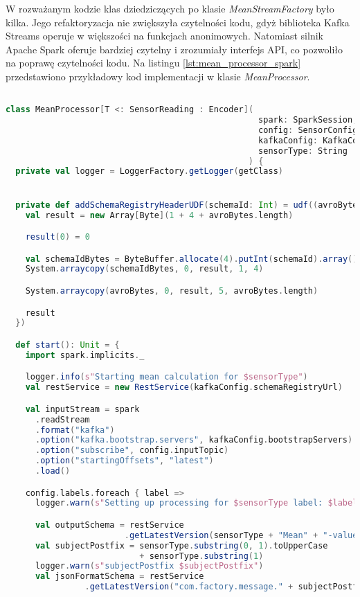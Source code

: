 \newpage

W rozważanym kodzie klas dziedziczących po klasie \textit{MeanStreamFactory} było kilka. Jego refaktoryzacja nie zwiększyła czytelności kodu, gdyż biblioteka Kafka Streams \cite{kafka_streams} operuje w większości na funkcjach anonimowych. Natomiast silnik Apache Spark oferuje bardziej czytelny i zrozumiały interfejs API, co pozwoliło na poprawę czytelności kodu. Na listingu \ref{lst:mean_processor_spark} przedstawiono przykładowy kod implementacji w klasie \textit{\mbox{MeanProcessor}}.

\begin{lstlisting}[caption=Nowa implementacja przetwarzająca strumienie danych, label={lst:mean_processor_spark},language=Scala]

class MeanProcessor[T <: SensorReading : Encoder](
                                                   spark: SparkSession,
                                                   config: SensorConfig,
                                                   kafkaConfig: KafkaConfig,
                                                   sensorType: String
                                                 ) {
  private val logger = LoggerFactory.getLogger(getClass)


  private def addSchemaRegistryHeaderUDF(schemaId: Int) = udf((avroBytes: Array[Byte]) => {
    val result = new Array[Byte](1 + 4 + avroBytes.length)

    result(0) = 0

    val schemaIdBytes = ByteBuffer.allocate(4).putInt(schemaId).array()
    System.arraycopy(schemaIdBytes, 0, result, 1, 4)

    System.arraycopy(avroBytes, 0, result, 5, avroBytes.length)

    result
  })

  def start(): Unit = {
    import spark.implicits._

    logger.info(s"Starting mean calculation for $sensorType")
    val restService = new RestService(kafkaConfig.schemaRegistryUrl)

    val inputStream = spark
      .readStream
      .format("kafka")
      .option("kafka.bootstrap.servers", kafkaConfig.bootstrapServers)
      .option("subscribe", config.inputTopic)
      .option("startingOffsets", "latest")
      .load()

    config.labels.foreach { label =>
      logger.warn(s"Setting up processing for $sensorType label: $label")

      val outputSchema = restService
                        .getLatestVersion(sensorType + "Mean" + "-value")
      val subjectPostfix = sensorType.substring(0, 1).toUpperCase 
                           + sensorType.substring(1)
      logger.warn(s"subjectPostfix $subjectPostfix")
      val jsonFormatSchema = restService
                .getLatestVersion("com.factory.message." + subjectPostfix)


\end{lstlisting}
